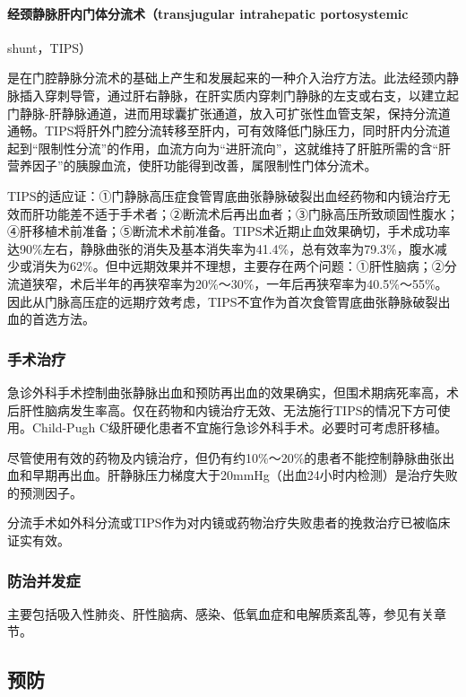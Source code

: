 \paragraph{经颈静脉肝内门体分流术（transjugular intrahepatic portosystemic}
shunt，TIPS）

是在门腔静脉分流术的基础上产生和发展起来的一种介入治疗方法。此法经颈内静脉插入穿刺导管，通过肝右静脉，在肝实质内穿刺门静脉的左支或右支，以建立起门静脉-肝静脉通道，进而用球囊扩张通道，放入可扩张性血管支架，保持分流道通畅。TIPS将肝外门腔分流转移至肝内，可有效降低门脉压力，同时肝内分流道起到“限制性分流”的作用，血流方向为“进肝流向”，这就维持了肝脏所需的含“肝营养因子”的胰腺血流，使肝功能得到改善，属限制性门体分流术。

TIPS的适应证：①门静脉高压症食管胃底曲张静脉破裂出血经药物和内镜治疗无效而肝功能差不适于手术者；②断流术后再出血者；③门脉高压所致顽固性腹水；④肝移植术前准备；⑤断流术术前准备。TIPS术近期止血效果确切，手术成功率达90\%左右，静脉曲张的消失及基本消失率为41.4\%，总有效率为79.3\%，腹水减少或消失为62\%。但中远期效果并不理想，主要存在两个问题：①肝性脑病；②分流道狭窄，术后半年的再狭窄率为20\%～30\%，一年后再狭窄率为40.5\%～55\%。因此从门脉高压症的远期疗效考虑，TIPS不宜作为首次食管胃底曲张静脉破裂出血的首选方法。

\subsubsection{手术治疗}

急诊外科手术控制曲张静脉出血和预防再出血的效果确实，但围术期病死率高，术后肝性脑病发生率高。仅在药物和内镜治疗无效、无法施行TIPS的情况下方可使用。Child-Pugh
C级肝硬化患者不宜施行急诊外科手术。必要时可考虑肝移植。

尽管使用有效的药物及内镜治疗，但仍有约10\%～20\%的患者不能控制静脉曲张出血和早期再出血。肝静脉压力梯度大于20mmHg（出血24小时内检测）是治疗失败的预测因子。

分流手术如外科分流或TIPS作为对内镜或药物治疗失败患者的挽救治疗已被临床证实有效。

\subsubsection{防治并发症}

主要包括吸入性肺炎、肝性脑病、感染、低氧血症和电解质紊乱等，参见有关章节。

\subsection{预防}

